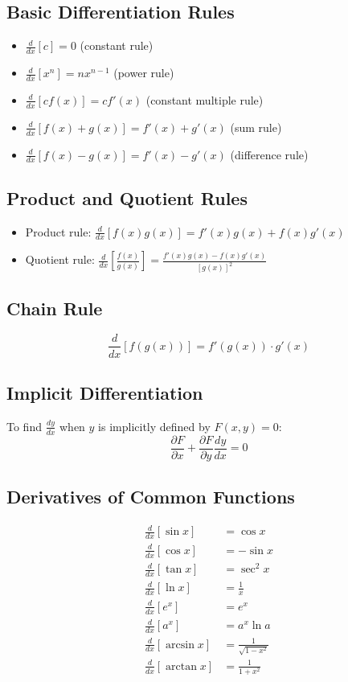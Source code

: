 \documentclass[11pt]{article}
\begin{document}
\subsection{Basic Differentiation Rules}
\begin{itemize}
    \item $\frac{d}{dx}[c] = 0$ (constant rule)
    \item $\frac{d}{dx}[x^n] = nx^{n-1}$ (power rule)
    \item $\frac{d}{dx}[cf(x)] = cf'(x)$ (constant multiple rule)
    \item $\frac{d}{dx}[f(x) + g(x)] = f'(x) + g'(x)$ (sum rule)
    \item $\frac{d}{dx}[f(x) - g(x)] = f'(x) - g'(x)$ (difference rule)
\end{itemize}

\subsection{Product and Quotient Rules}
\begin{itemize}
    \item Product rule: $\frac{d}{dx}[f(x)g(x)] = f'(x)g(x) + f(x)g'(x)$
    \item Quotient rule: $\frac{d}{dx}\left[\frac{f(x)}{g(x)}\right] = \frac{f'(x)g(x) - f(x)g'(x)}{[g(x)]^2}$
\end{itemize}

\subsection{Chain Rule}
$$\frac{d}{dx}[f(g(x))] = f'(g(x)) \cdot g'(x)$$

\subsection{Implicit Differentiation}
To find $\frac{dy}{dx}$ when $y$ is implicitly defined by $F(x,y) = 0$:
$$\frac{\partial F}{\partial x} + \frac{\partial F}{\partial y} \frac{dy}{dx} = 0$$

\subsection{Derivatives of Common Functions}
\begin{align}
\frac{d}{dx}[\sin x] &= \cos x \\
\frac{d}{dx}[\cos x] &= -\sin x \\
\frac{d}{dx}[\tan x] &= \sec^2 x \\
\frac{d}{dx}[\ln x] &= \frac{1}{x} \\
\frac{d}{dx}[e^x] &= e^x \\
\frac{d}{dx}[a^x] &= a^x \ln a \\
\frac{d}{dx}[\arcsin x] &= \frac{1}{\sqrt{1-x^2}} \\
\frac{d}{dx}[\arctan x] &= \frac{1}{1+x^2}
\end{align}
\end{document}
